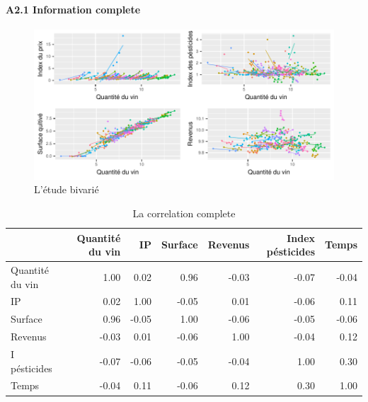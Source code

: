 \documentclass[11pt,]{article}
\let\oldparagraph\paragraph
\renewcommand{\paragraph}[1]{\oldparagraph{#1}\mbox{}}
\begin{document}
\hypertarget{a2.1-information-complete}{%
\paragraph{A2.1 Information complete}\label{a2.1-information-complete}}

\FloatBarrier

\begin{figure}[!htbp]

{\centering \includegraphics{note2pres_files/figure-latex/unnamed-chunk-52-1} 

}

\caption{L'étude bivarié}\label{fig:unnamed-chunk-52}
\end{figure}

\FloatBarrier

\FloatBarrier

\begin{table}[ht]
\centering
\begin{tabular}{l|rrrrrr}
  \hline
 & Quantité du vin & IP & Surface & Revenus & Index pésticides & Temps \\ 
  \hline
Quantité du vin & 1.00 & 0.02 & 0.96 & -0.03 & -0.07 & -0.04 \\ 
  IP & 0.02 & 1.00 & -0.05 & 0.01 & -0.06 & 0.11 \\ 
  Surface & 0.96 & -0.05 & 1.00 & -0.06 & -0.05 & -0.06 \\ 
  Revenus & -0.03 & 0.01 & -0.06 & 1.00 & -0.04 & 0.12 \\ 
  I pésticides & -0.07 & -0.06 & -0.05 & -0.04 & 1.00 & 0.30 \\ 
  Temps & -0.04 & 0.11 & -0.06 & 0.12 & 0.30 & 1.00 \\ 
   \hline
\end{tabular}
\caption{La correlation complete} 
\end{table}
\end{document}
